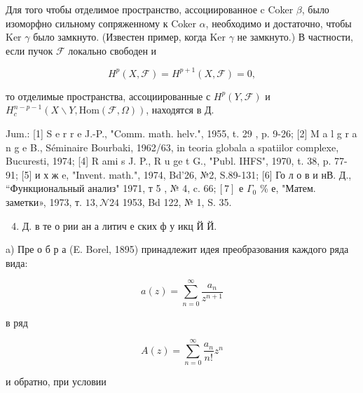 \documentclass[10pt]{article}
\begin{document}
Для того чтобы отделимое пространство, ассоциированное c Coker $\beta$, было изоморфно сильному сопряженному к Coker $\alpha$, необходимо и достаточно, чтобы Ker $\gamma$ было замкнуто. (Известен пример, когда Ker $\gamma$ не замкнуто.) В частности, если пучок $\mathscr{\mathcal { F }}$ локально свободен и



\[

H^{p}(X, \mathscr{F})=H^{p+1}(X, \mathscr{F})=0,

\]



то отделимые пространства, ассоциированные с $H^{p}(Y, \mathscr{F})$ и $H_{c}^{n-p-1}(X \backslash Y, \mathrm{Hom}(\mathscr{F}, \Omega))$, находятся в Д.



Jum.: [1] S e r r e J.-P., "Comm. math. helv.", 1955, t. 29 , p. 9-26; [2] M a l g r a n g e B., Séminaire Bourbaki, 1962/63, in teoria globala a spatiilor complexe, Bucuresti, 1974; [4] R ami s J. P., R u ge t G., "Publ. IHFS", 1970, t. 38, p. 77-91; [5] и х ж e, "Invent. math.", 1974, Bd'26, №2, S.89-131; [6] Го л о в и нВ. Д., “Функциональный анализ" 1971, т 5 , № 4, c. $66 ;[7]$ е $\Gamma_{0}$ \% е, "Матем. заметки», 1973, т. $13, \mathcal{N} 24$ 1953, Bd 122, № 1, S. 35.



\begin{enumerate}

  \setcounter{enumi}{3}

  \item Д. в те о рии ан а литич е ских ф у икц Й Й.

\end{enumerate}



a) Пре о б р а (E. Borel, 1895) принадлежит идея преобразования каждого ряда вида:



\[

a(z)=\sum_{n=0}^{\infty} \frac{a_{n}}{z^{n+1}}

\]



в ряд



\[

A(z)=\sum_{n=0}^{\infty} \frac{a_{n}}{n !} z^{n}

\]



и обратно, при условии
\end{document}
